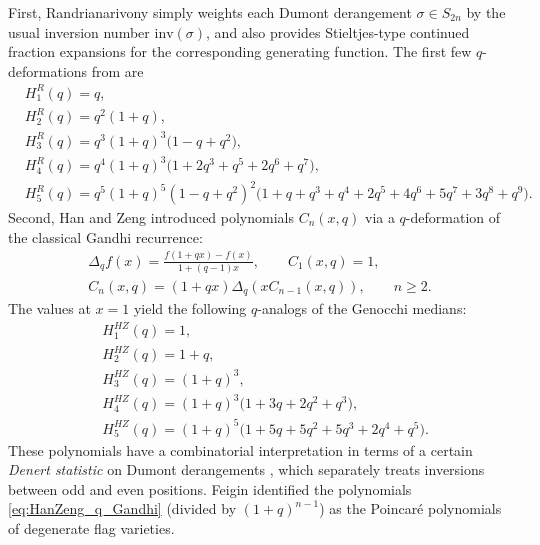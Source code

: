 \documentclass[pdftex]{sigma}
\numberwithin{equation}{section}
\theoremstyle{definition}
\begin{document}
First, Randrianarivony \cite{Randrianarivony1997} simply weights each Dumont
derangement $\sigma\in S_{2n}$ by the usual inversion number
$\mathrm{inv}(\sigma)$, and also provides Stieltjes-type continued fraction
expansions for the corresponding generating function.
The first few $q$-deformations from \cite{Randrianarivony1997} are
\begin{equation}
	\label{eq:Randrianarivony_q_Gandhi}
	\begin{split}
		&H_1^R(q)= q, \\
		&H_2^R(q)= q^2 (1 + q), \\
		&H_3^R(q)= q^3 (1 + q)^3 \bigl(1 - q + q^2\bigr), \\
		&H_4^R(q)= q^4 (1 + q)^3 \bigl(1 + 2q^3 + q^5 + 2q^6 + q^7\bigr), \\
		&H_5^R(q)= q^5 (1 + q)^5 (1 - q + q^2)^2 \bigl(1 + q + q^3 + q^4 + 2q^5 +
		4q^6 + 5q^7 + 3q^8 + q^9\bigr).
	\end{split}
\end{equation}
Second, Han and Zeng \cite{HanZeng1999,HanZeng1999Discrete}
introduced polynomials $C_n(x,q)$ via a $q$-deformation of the classical Gandhi
recurrence:
\begin{gather*}
	\Delta_q f(x) = \frac{f(1+qx)-f(x)}{1+(q-1)x}, \qquad C_1(x,q)=1, \\
	C_n(x,q) = (1+qx) \Delta_q  ( x C_{n-1}(x,q) ), \qquad n \ge 2.
\end{gather*}
The values at $x=1$ yield the following $q$-analogs of the Genocchi medians:
\begin{equation}
	\label{eq:HanZeng_q_Gandhi}
	\begin{split}
		&H_1^{HZ}(q)= 1, \\
&H_2^{HZ}(q)= 1 + q, \\
&H_3^{HZ}(q)= (1+q)^3, \\
		&H_4^{HZ}(q)= (1+q)^3 \bigl(1 + 3q + 2q^2 + q^3\bigr), \\
		&H_5^{HZ}(q)= (1+q)^5 \bigl(1 + 5q + 5q^2 + 5q^3 + 2q^4 + q^5\bigr).
	\end{split}
\end{equation}
These polynomials have a combinatorial interpretation in terms of a certain
\emph{Denert statistic} on Dumont derangements \cite{HanZeng1999Discrete}, which
separately treats inversions between odd and even positions.
Feigin \cite{Feigin2012} identified the polynomials \eqref{eq:HanZeng_q_Gandhi}
(divided by $(1+q)^{n-1}$) as the Poincar\'e polynomials of degenerate flag
varieties.
\end{document}
